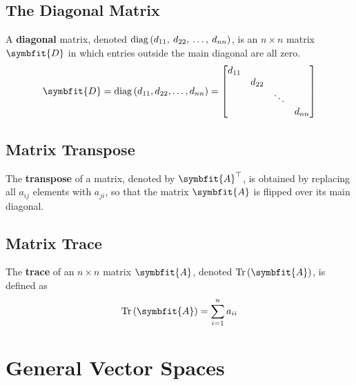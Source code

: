 \documentclass{article}
\begin{document}
\subsection{The Diagonal Matrix}
\begin{definition}
    A \textbf{diagonal} matrix, denoted
    \(\operatorname{diag}{\left( d_{11},\: d_{22},\: \ldots,\: d_{nn} \right)}\), is
    an \(n \times n\) matrix \(\symbfit{D}\) in which entries outside
    the main diagonal are all zero.
    \begin{equation*}
        \symbfit{D} = \diag{\left( d_{11}, d_{22}, \ldots, d_{nn} \right)} =
        \begin{bmatrix}
            d_{11} &        &        &        \\
                   & d_{22} &        &        \\
                   &        & \ddots &        \\
                   &        &        & d_{nn}
        \end{bmatrix}
    \end{equation*}
\end{definition}
\subsection{Matrix Transpose}
\begin{definition}
    The \textbf{transpose} of a matrix, denoted by \(\symbfit{A}^\top\),
    is obtained by replacing all \(a_{ij}\) elements with \(a_{ji}\), so
    that the matrix \(\symbfit{A}\) is flipped over its main diagonal.
\end{definition}
\subsection{Matrix Trace}
\begin{definition}
    The \textbf{trace} of an \(n \times n\) matrix \(\symbfit{A}\),
    denoted \(\tr{\left( \symbfit{A} \right)}\), is defined as
    \begin{equation*}
        \tr{\left( \symbfit{A} \right)} = \sum_{i=1}^n a_{ii}
    \end{equation*}
\end{definition}
\newpage
\section{General Vector Spaces}
\end{document}
